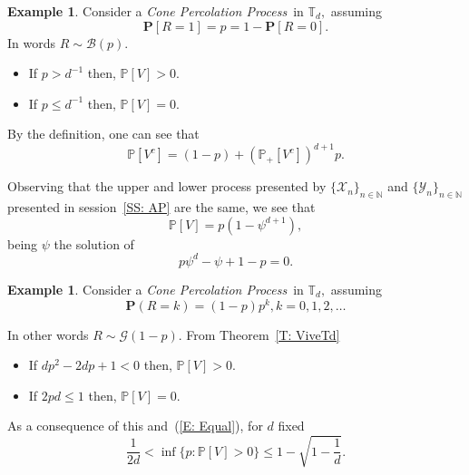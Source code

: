 \documentclass[12pt,reqno,oneside]{amsart}
\theoremstyle{plain}
\theoremstyle{definition}
\newtheorem{exa}[teo]{Example}
\numberwithin{equation}{section}
\begin{document}
\begin{exa}
\label{E: B(p)}
Consider a {\textit{Cone Percolation Process}}\ in ${{\mathbb T}}_d,$ assuming
\[
{{\mathbf P}}[R = 1] = p = 1 - {{\mathbf P}}[R = 0].
\]
In words $R \sim {\mathcal B}(p).$

\begin{itemize}
\item If $p > d^{-1}$ then, ${{\mathbb P}}[V]>0.$
\item If $p \leq d^{-1}$ then, ${{\mathbb P}}[V]=0.$
\end{itemize}

By the definition, one can see that
\[
{{\mathbb P}}[V^c] = (1-p) + {({{\mathbb P}}_+[V^c])}^{d+1}p.
\]
\end{exa}

Observing that the upper and lower process presented by
$\{\mathcal{X}_n\}_{n \in {{\mathbb N}}}$ and $\{\mathcal{Y}_n\}_{n \in {{\mathbb N}}}$ 
presented in session~\ref{SS: AP} are the same, we see that
\[
{{\mathbb P}}[V]=p(1-\psi^{d+1}),
\]
being $\psi$ the solution of
\[
p\psi^d-\psi+1-p=0.
\]

\begin{exa} 
\label{E: G1-p}
Consider a {\textit{Cone Percolation Process}}\ in ${{\mathbb T}}_d,$ assuming
\[
{{\mathbf P}}(R = k) = (1-p)p^{k}, k=0,1,2,\dots
\]

In other words $R \sim {\mathcal G}(1-p).$ From Theorem~\ref{T: ViveTd}

\begin{itemize}
\item If $dp^2 - 2dp + 1 < 0$ then, ${{\mathbb P}}[V]>0$.
\item If $2pd \leq 1$ then, ${{\mathbb P}}[V]=0$.
\end{itemize}

As a consequence of this and~(\ref{E: Equal}), for $d$ fixed
\[
\frac{1}{2d} < \inf\{p: {{\mathbb P}}[V]>0\} \leq 1 - \sqrt{1- \frac{1}{d}}.
\]
\end{exa}
\end{document}
